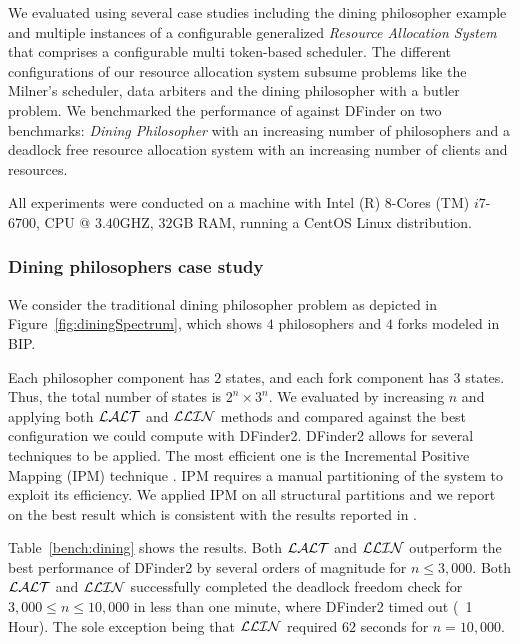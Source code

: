 We evaluated \deadlocktool{} using several case studies including the dining philosopher example and multiple instances
of a configurable generalized {\em Resource Allocation System} that comprises 
a configurable multi token-based scheduler.
The different configurations of our resource allocation system subsume problems like the Milner's scheduler, 
data arbiters and the dining philosopher with a butler problem. 
We benchmarked the performance of \deadlocktool{} against DFinder \cite{DFinder2}
on two benchmarks: 
{\em Dining Philosopher} with an increasing number of philosophers and 
a deadlock free resource allocation system with an increasing number of clients and resources. 

All experiments were conducted on a machine with Intel (R) $8$-Cores (TM) $i7$-$6700$, CPU @ $3.40$GHZ, $32$GB RAM, 
running a CentOS Linux distribution. 

\subsubsection{Dining philosophers case study} 
We consider the traditional dining philosopher problem as depicted in 
Figure~\ref{fig:diningSpectrum}, which shows $4$ philosophers and $4$ forks modeled in BIP. 

Each philosopher component has $2$ states, and each fork component has $3$ states. 
Thus, the total number of states is $2^n \times 3^n$. 
We evaluated \deadlocktool{} by increasing $n$ and applying both $\mathcal{LALT}$ and $\mathcal{LLIN}$ methods and compared against the best configuration 
we could compute with DFinder2. 
DFinder2 allows for several techniques to be applied. The most efficient one is 
the Incremental Positive Mapping (IPM) technique \cite{DFinder2}. 
IPM requires a manual partitioning of the system to exploit its efficiency. 
We applied IPM on all structural partitions and we report on the best result which is consistent 
with the results reported in . 

Table~\ref{bench:dining} shows the results. Both $\mathcal{LALT}$ and $\mathcal{LLIN}$ outperform the best performance of DFinder2 by several orders of magnitude 
for $n\leq 3,000$. Both $\mathcal{LALT}$ and $\mathcal{LLIN}$ successfully completed the deadlock freedom check for $3,000 \leq n \leq 10,000$ 
in less than one minute, where DFinder2 timed out (~1 Hour). The sole exception being that
$\mathcal{LLIN}$ required $62$ seconds for $n=10,000$. 


